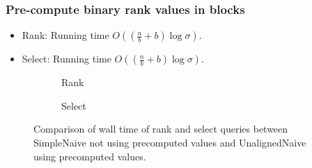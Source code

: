 \documentclass{beamer}
\begin{document}
\begin{frame}
\frametitle{Pre-compute binary rank values in blocks}
\begin{itemize}
\item Rank: Running time $O((\frac{n}{b} + b) \log \sigma)$.
\item Select: Running time $O((\frac{n}{b} + b) \log \sigma)$.
\end{itemize}
\begin{figure}
	\begin{subfigure}{0.48\textwidth}
		\begin{tiny}
		\scalebox{.7}{}
		\end{tiny}
		\caption{Rank}
	\end{subfigure}
	\hfill
	\begin{subfigure}{0.48\textwidth}
		\begin{tiny}
		\scalebox{.7}{}
		\end{tiny}
		\caption{Select}
	\end{subfigure}
	\caption{Comparison of wall time of rank and select queries between SimpleNaive not using precomputed values and UnalignedNaive using precomputed values.}
\end{figure}
\end{frame}

\end{document}
